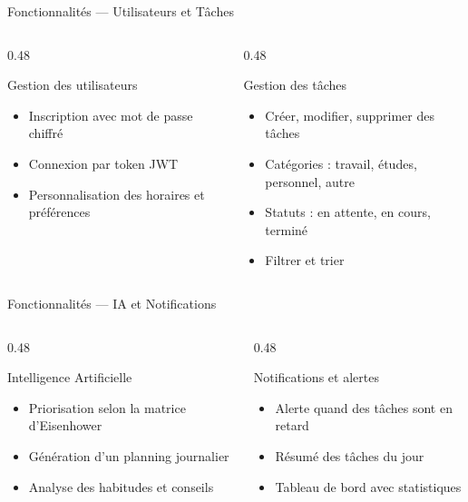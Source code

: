 \documentclass[aspectratio=169, 10pt]{beamer}
\begin{document}
\begin{frame}{Fonctionnalités — Utilisateurs et Tâches}
\begin{columns}[T]
\begin{column}{0.48\textwidth}
\begin{exampleblock}{Gestion des utilisateurs}
\small
\begin{itemize}
    \item Inscription avec mot de passe chiffré
    \item Connexion par token JWT
    \item Personnalisation des horaires et préférences
\end{itemize}
\end{exampleblock}
\end{column}
\begin{column}{0.48\textwidth}
\begin{block}{Gestion des tâches}
\small
\begin{itemize}
    \item Créer, modifier, supprimer des tâches
    \item Catégories : travail, études, personnel, autre
    \item Statuts : en attente, en cours, terminé
    \item Filtrer et trier
\end{itemize}
\end{block}
\end{column}
\end{columns}
\end{frame}

\begin{frame}{Fonctionnalités — IA et Notifications}
\begin{columns}[T]
\begin{column}{0.48\textwidth}
\begin{alertedblock}{Intelligence Artificielle}
\small
\begin{itemize}
    \item Priorisation selon la matrice d'Eisenhower
    \item Génération d'un planning journalier
    \item Analyse des habitudes et conseils
\end{itemize}
\end{alertedblock}
\end{column}
\begin{column}{0.48\textwidth}
\begin{block}{Notifications et alertes}
\small
\begin{itemize}
    \item Alerte quand des tâches sont en retard
    \item Résumé des tâches du jour
    \item Tableau de bord avec statistiques
\end{itemize}
\end{block}
\end{column}
\end{columns}
\end{frame}
\end{document}
